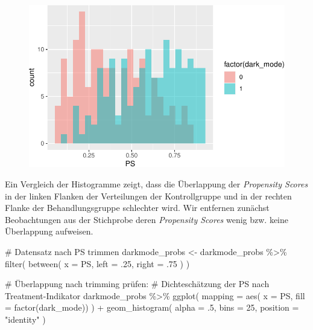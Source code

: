 \documentclass[
  a4paper,
  DIV=11,
  oneside]{scrreprt}
\newenvironment{Shaded}{\begin{snugshade}}{\end{snugshade}}
\newcommand{\AttributeTok}[1]{\textcolor[rgb]{0.40,0.45,0.13}{#1}}
\newcommand{\CommentTok}[1]{\textcolor[rgb]{0.37,0.37,0.37}{#1}}
\newcommand{\DecValTok}[1]{\textcolor[rgb]{0.68,0.00,0.00}{#1}}
\newcommand{\FunctionTok}[1]{\textcolor[rgb]{0.28,0.35,0.67}{#1}}
\newcommand{\NormalTok}[1]{\textcolor[rgb]{0.00,0.23,0.31}{#1}}
\newcommand{\OtherTok}[1]{\textcolor[rgb]{0.00,0.23,0.31}{#1}}
\newcommand{\SpecialCharTok}[1]{\textcolor[rgb]{0.37,0.37,0.37}{#1}}
\newcommand{\StringTok}[1]{\textcolor[rgb]{0.13,0.47,0.30}{#1}}
\begin{document}
\begin{figure}[t]

{\centering \includegraphics{Matching_files/figure-pdf/unnamed-chunk-21-1.pdf}

}

\end{figure}

Ein Vergleich der Histogramme zeigt, dass die Überlappung der
\emph{Propensity Scores} in der linken Flanken der Verteilungen der
Kontrollgruppe und in der rechten Flanke der Behandlungsgruppe
schlechter wird. Wir entfernen zunächst Beobachtungen aus der Stichprobe
deren \emph{Propensity Scores} wenig bzw. keine Überlappung aufweisen.

\begin{Shaded}
\begin{Highlighting}[]
\CommentTok{\# Datensatz nach PS trimmen}
\NormalTok{darkmode\_probs }\OtherTok{\textless{}{-}}\NormalTok{ darkmode\_probs }\SpecialCharTok{\%\textgreater{}\%} 
  \FunctionTok{filter}\NormalTok{(}
    \FunctionTok{between}\NormalTok{(}
      \AttributeTok{x =}\NormalTok{ PS,}
      \AttributeTok{left =}\NormalTok{ .}\DecValTok{25}\NormalTok{,}
      \AttributeTok{right =}\NormalTok{ .}\DecValTok{75}
\NormalTok{    )}
\NormalTok{  )}
\end{Highlighting}
\end{Shaded}

\begin{Shaded}
\begin{Highlighting}[]
\CommentTok{\# Überlappung nach trimming prüfen:}
\CommentTok{\# Dichteschätzung der PS nach Treatment{-}Indikator}
\NormalTok{darkmode\_probs }\SpecialCharTok{\%\textgreater{}\%}
\FunctionTok{ggplot}\NormalTok{(}
  \AttributeTok{mapping =} \FunctionTok{aes}\NormalTok{(}
    \AttributeTok{x =}\NormalTok{ PS, }
    \AttributeTok{fill =} \FunctionTok{factor}\NormalTok{(dark\_mode))}
\NormalTok{  ) }\SpecialCharTok{+} 
  \FunctionTok{geom\_histogram}\NormalTok{(}
    \AttributeTok{alpha =}\NormalTok{ .}\DecValTok{5}\NormalTok{, }
    \AttributeTok{bins =} \DecValTok{25}\NormalTok{, }
    \AttributeTok{position =} \StringTok{"identity"}
\NormalTok{  )}
\end{Highlighting}
\end{Shaded}
\end{document}

